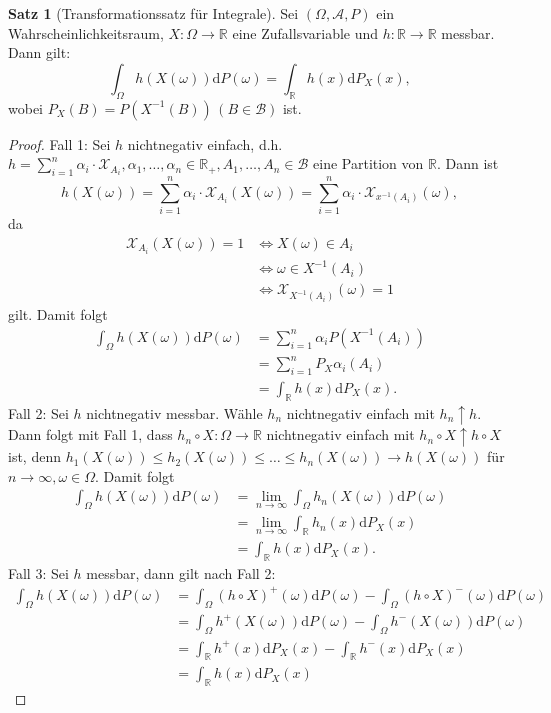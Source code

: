 \documentclass[a4paper,12pt,fleqn]{scrartcl}
\newcommand{\R}{\mathbb{R}}
\newcommand{\m}[1]{\mathcal{ #1 }}
\newcommand{\WR}{Wahrscheinlichkeitsraum}
\theoremstyle{definition}
\newtheorem{satz}[definition]{Satz}
\theoremstyle{plain}
\theoremstyle{remark}
\begin{document}
\begin{satz}[Transformationssatz für Integrale]
Sei $(\Omega , \m{A} , P)$ ein \WR, $X: \Omega \rightarrow \R$ eine Zufallsvariable und $h: \R \rightarrow \R$ messbar. Dann gilt:
\[\int_\Omega h(X(\omega)) \mathrm{d}P(\omega) = \int_\R h(x) \mathrm{d}P_X(x),\]
wobei $P_X(B) = P(X^{-1}(B)) \, (B \in \m{B})$ ist.
\end{satz}
\begin{proof}
Fall 1: Sei $h$ nichtnegativ einfach, d.h. $h = \sum_{i=1}^n \alpha_i \cdot \m{X}_{A_i}, \alpha_1 , \ldots , \alpha_n \in \R_+, A_1 , \ldots , A_n \in \m{B}$ eine Partition von $\R$. Dann ist
\[h(X(\omega)) = \sum_{i=1}^n \alpha_i \cdot \m{X}_{A_i} (X(\omega)) = \sum_{i=1}^n \alpha_i \cdot \m{X}_{x^{-1}(A_i)} (\omega),\]
da
\begin{align*}
\m{X}_{A_i} (X(\omega)) = 1 &\Leftrightarrow X(\omega) \in A_i \\
&\Leftrightarrow \omega \in X^{-1} (A_i) \\
&\Leftrightarrow \m{X}_{X^{-1} (A_i)} (\omega) = 1
\end{align*}
gilt. Damit folgt
\begin{align*}
\int_\Omega h(X(\omega)) \mathrm{d} P(\omega) &= \sum_{i=1}^n \alpha_i P(X^{-1} (A_i)) \\
&= \sum_{i=1}^n P_X \alpha_i (A_i) \\
&= \int_\R h(x) \mathrm{d} P_X (x).
\end{align*}
Fall 2: Sei $h$ nichtnegativ messbar. Wähle $h_n$ nichtnegativ einfach mit $h_n \uparrow h$. Dann folgt mit Fall 1, dass $h_n \circ X: \Omega \rightarrow \R$ nichtnegativ einfach mit $h_n \circ X \uparrow h \circ X$ ist, denn $h_1(X(\omega)) \leq h_2(X(\omega)) \leq \ldots \leq h_n(X(\omega)) \rightarrow h(X(\omega))$ für $n \rightarrow \infty, \omega \in \Omega$. Damit folgt
\begin{align*}
\int_\Omega h(X(\omega)) \mathrm{d}P(\omega) &= \lim_{n \rightarrow \infty} \int_\Omega h_n (X(\omega)) \mathrm{d}P(\omega) \\
&= \lim_{n \rightarrow \infty} \int_\R h_n(x) \mathrm{d}P_X(x) \\
&= \int_\R h(x) \mathrm{d}P_X(x).
\end{align*}
Fall 3: Sei $h$ messbar, dann gilt nach Fall 2:
\begin{align*}
\int_\Omega h(X(\omega)) \mathrm{d}P(\omega) &= \int_\Omega (h \circ X)^+ (\omega) \mathrm{d}P(\omega) - \int_\Omega (h \circ X)^- (\omega) \mathrm{d}P(\omega) \\
&= \int_\Omega h^+(X(\omega)) \mathrm{d}P(\omega) - \int_\Omega h^-(X(\omega)) \mathrm{d}P(\omega) \\
&= \int_\R h^+(x) \mathrm{d}P_X(x) - \int_\R h^-(x) \mathrm{d}P_X(x) \\
&= \int_\R h(x) \mathrm{d}P_X(x)
\end{align*}
\end{proof}
\end{document}
